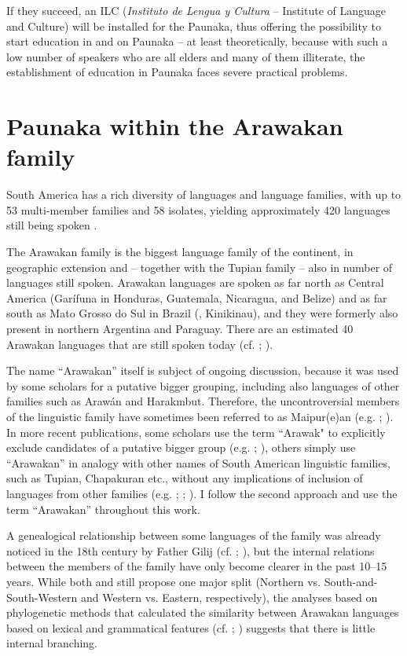 If they succeed, an ILC (\textit{Instituto de Lengua y Cultura} – Institute of Language and Culture) will be installed for the Paunaka, thus offering the possibility to start education in and on Paunaka – at least theoretically, because with such a low number of speakers who are all elders and many of them illiterate, the establishment of education in Paunaka faces severe practical problems.

\section{Paunaka within the Arawakan family}\label{sec:Affiliation}
South America has a rich diversity of languages and language families, with up to 53 multi-member families and 58 isolates, yielding approximately 420 languages still being spoken \citep[59]{Campbell2012a}.

The Arawakan family is the biggest language family of the continent, in geographic extension and – together with the Tupian family – also in number of languages still spoken. Arawakan languages are spoken as far north as Central America (Garífuna in Honduras, Guatemala, Nicaragua, and Belize) and as far south as Mato Grosso do Sul in Brazil (, Kinikinau), and they were formerly also present in northern Argentina and Paraguay. There are an estimated 40 Arawakan languages that are still spoken today (cf. \citealt[65]{Aikhenvald1999}; \citealt[71]{Campbell2012a}).

The name “Arawakan” itself is subject of ongoing discussion, because it was used by some scholars for a putative bigger grouping, including also languages of other families such as Arawán and Harakmbut. Therefore, the uncontroversial members of the linguistic family have sometimes been referred to as Maipur(e)an (e.g. \citealt[]{Kaufman1990}; \citealt[]{Payne1991}). In more recent publications, some scholars use the term “Arawak" to explicitly exclude candidates of a putative bigger group (e.g. \citealt{Aikhenvald1999}; \citealt[]{Michael2008}), others simply use “Arawakan” in analogy with other names of South American linguistic families, such as Tupian, Chapakuran etc., without any implications of inclusion of languages from other families (e.g. \citealt[]{Campbell2012a}; \citealt[]{Muysken_et_al2016}; \citealt[]{Hammarstroem2022}).  I follow the second approach and use the term “Arawakan” throughout this work.

A genealogical relationship between some languages of the family was already noticed in the 18th century by Father Gilij (cf. \citealt[363]{Payne1991}; \citealt[73]{Aikhenvald1999}), but the internal relations between the members of the family have only become clearer in the past 10–15 years. While both \citet[]{Aikhenvald1999} and \citet[]{Ramirez2001} still propose one major split (Northern vs. South-and-South-Western and Western vs. Eastern, respectively), the analyses based on phylogenetic methods that calculated the similarity between Arawakan languages based on lexical and grammatical features (cf.  \citealt[]{WalkerRibeiro2011}; \citealt[]{Danielsen_et_al2011}) suggests that there is little internal branching. 


